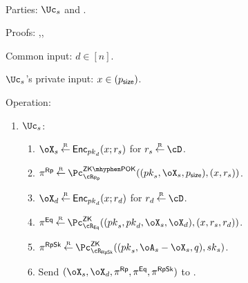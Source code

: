 \begin{protocol}~\label{prot:ConfidentialTransactions:Transfer}
	\item[Parties:] $\Uc_s$ and \Cc.
	
\item[Proofs:]   \piZKPOK{\rRp},\piZK{\rRpSk},\piZK{\rEq}



	
	\item[Common input:] $d\in [n]$.
	
	\item[$\Uc_s$'s private  input:] $x \in (p_{\mathsf{size}})$.
	
\item[Operation:] ~
	
	\begin{enumerate}
		\item  $\Uc_s$: 
		
		\begin{enumerate}
			\item $\oX_s \getsr \Enc_{\pk_d}(x;r_s)$ for $r_s \getsr \cD$.
			
		
			\item $\pi^\RPs \getsr \pZKPOK{\rRp}((\pk_s,\oX_s,\psize),(x,r_s))$.
			
			
			\item $\oX_d \getsr \Enc_{\pk_d}(x;r_d)$ for $r_d \getsr \cD$.
			
			
		\item $\pi^\Eqs \getsr \pZK{\rEq}((\pk_s,\pk_d,\oX_s, \oX_d),(x,r_s,r_d))$.
			
			
			
			
			
		 

			
			
		
			
		\item $\pi^\RpSkS \getsr \pZK{\rRpSk}((\pk_s,\oA_s- \oX_s, q),\sk_s)$. 
			
			
			\item Send $(\oX_s,\oX_d,\pi^\RPs,\pi^\Eqs,\pi^\RpSkS)$ to \Cc.   
		\end{enumerate}
		

\end{enumerate}
\end{protocol}
